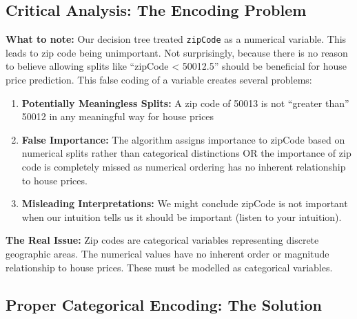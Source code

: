 \documentclass[
  letterpaper,
  DIV=11,
  numbers=noendperiod]{scrartcl}
\providecommand{\tightlist}{%
  \setlength{\itemsep}{0pt}\setlength{\parskip}{0pt}}
\begin{document}
\subsection{Critical Analysis: The Encoding
Problem}\label{critical-analysis-the-encoding-problem}

\begin{tcolorbox}[enhanced jigsaw, toprule=.15mm, left=2mm, breakable, colbacktitle=quarto-callout-warning-color!10!white, opacitybacktitle=0.6, coltitle=black, colback=white, colframe=quarto-callout-warning-color-frame, title=\textcolor{quarto-callout-warning-color}{\faExclamationTriangle}\hspace{0.5em}{⚠️ The Problem Revealed}, rightrule=.15mm, toptitle=1mm, titlerule=0mm, opacityback=0, bottomtitle=1mm, arc=.35mm, bottomrule=.15mm, leftrule=.75mm]

\textbf{What to note:} Our decision tree treated \texttt{zipCode} as a
numerical variable. This leads to zip code being unimportant. Not
surprisingly, because there is no reason to believe allowing splits like
``zipCode \textless{} 50012.5'' should be beneficial for house price
prediction. This false coding of a variable creates several problems:

\begin{enumerate}
\def\labelenumi{\arabic{enumi}.}
\tightlist
\item
  \textbf{Potentially Meaningless Splits:} A zip code of 50013 is not
  ``greater than'' 50012 in any meaningful way for house prices
\item
  \textbf{False Importance:} The algorithm assigns importance to zipCode
  based on numerical splits rather than categorical distinctions OR the
  importance of zip code is completely missed as numerical ordering has
  no inherent relationship to house prices.
\item
  \textbf{Misleading Interpretations:} We might conclude zipCode is not
  important when our intuition tells us it should be important (listen
  to your intuition).
\end{enumerate}

\textbf{The Real Issue:} Zip codes are categorical variables
representing discrete geographic areas. The numerical values have no
inherent order or magnitude relationship to house prices. These must be
modelled as categorical variables.

\end{tcolorbox}

\subsection{Proper Categorical Encoding: The
Solution}\label{proper-categorical-encoding-the-solution}
\end{document}

